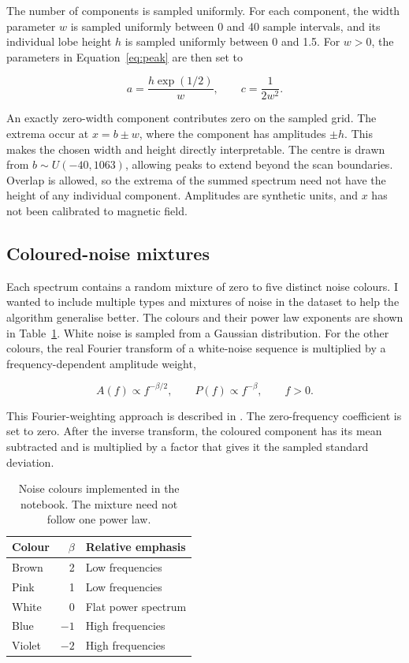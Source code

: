 The number of components is sampled uniformly. For each component, the width parameter $w$ is sampled uniformly between 0 and 40 sample intervals, and its individual lobe height $h$ is sampled uniformly between 0 and 1.5. For $w>0$, the parameters in Equation~\ref{eq:peak} are then set to

\begin{equation}
 a=\frac{h\exp(1/2)}{w},\qquad c=\frac{1}{2w^2}.
\end{equation}

An exactly zero-width component contributes zero on the sampled grid. The extrema occur at $x=b\pm w$, where the component has amplitudes $\pm h$. This makes the chosen width and height directly interpretable. The centre is drawn from $b\sim U(-40,1063)$, allowing peaks to extend beyond the scan boundaries. Overlap is allowed, so the extrema of the summed spectrum need not have the height of any individual component. Amplitudes are synthetic units, and $x$ has not been calibrated to magnetic field.

\subsection{Coloured-noise mixtures}

Each spectrum contains a random mixture of zero to five distinct noise colours. I wanted to include multiple types and mixtures of noise in the dataset to help the algorithm generalise better. The colours and their power law exponents are shown in Table~\ref{tab:colours}. White noise is sampled from a Gaussian distribution. For the other colours, the real Fourier transform of a white-noise sequence is multiplied by a frequency-dependent amplitude weight,

\begin{equation}
 A(f)\propto f^{-\beta/2},\qquad P(f)\propto f^{-\beta},\qquad f>0.
\end{equation}

This Fourier-weighting approach is described in \cite{bob2021noise}. The zero-frequency coefficient is set to zero. After the inverse transform, the coloured component has its mean subtracted and is multiplied by a factor that gives it the sampled standard deviation.

\begin{table}[htbp]
\centering
\begin{tabular}{lrl}
\toprule
Colour & $\beta$ & Relative emphasis\\
\midrule
Brown & 2 & Low frequencies\\
Pink & 1 & Low frequencies\\
White & 0 & Flat power spectrum\\
Blue & $-1$ & High frequencies\\
Violet & $-2$ & High frequencies\\
\bottomrule
\end{tabular}
\caption{Noise colours implemented in the notebook. The mixture need not follow one power law.}
\label{tab:colours}
\end{table}

